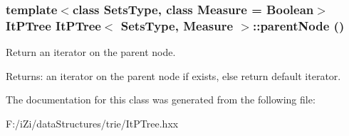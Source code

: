 \subsubsection{\setlength{\rightskip}{0pt plus 5cm}template$<$class Sets\-Type, class Measure = Boolean$>$ {\bf It\-PTree} {\bf It\-PTree}$<$ Sets\-Type, Measure $>$::parent\-Node ()\hspace{0.3cm}{\tt  [inline]}}\label{class_it_p_tree_00d3bfff31faa63cdca7075c195b3526}


Return an iterator on the parent node. 

\begin{Desc}
\item[Returns:]an iterator on the parent node if exists, else return default iterator. \end{Desc}


The documentation for this class was generated from the following file:\begin{CompactItemize}
\item 
F:/i\-Zi/data\-Structures/trie/It\-PTree.hxx\end{CompactItemize}
